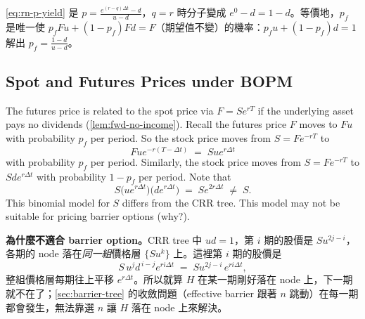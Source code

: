 \suppstart
{}

\begin{remark}
	\eqref{eq:rn-p-yield} 是 $p=\frac{e^{(r-q)\Delta t}-d}{u-d}$，$q=r$ 時分子變成 $e^{0}-d=1-d$。等價地，$p_{f}$ 是唯一使 $p_{f}Fu+(1-p_{f})Fd=F$（期望值不變）的機率：$p_{f}u+(1-p_{f})d=1$ 解出 $p_{f}=\frac{1-d}{u-d}$。
\end{remark}
\suppend

\subsection{Spot and Futures Prices under BOPM}


The futures price is related to the spot price via $F=Se^{rT}$ if the underlying asset pays no dividends (\autoref{lem:fwd-no-income}).
Recall the futures price $F$ moves to $Fu$ with probability $p_{f}$ per period.
So the stock price moves from $S=Fe^{-rT}$ to
\[
	Fue^{-r(T-\Delta t)} \;=\; Sue^{r\Delta t}
\]
with probability $p_{f}$ per period.
Similarly, the stock price moves from $S=Fe^{-rT}$ to $Sde^{r\Delta t}$ with probability $1-p_{f}$ per period.
Note that
\[
	S\bigl(ue^{r\Delta t}\bigr)\bigl(de^{r\Delta t}\bigr) \;=\; Se^{2r\Delta t} \;\neq\; S .
\]
This binomial model for $S$ differs from the CRR tree.
This model may not be suitable for pricing barrier options (why?).

\suppstart
{}

\begin{remark}
	\textbf{為什麼不適合 barrier option。}CRR tree 中 $ud=1$，第 $i$ 期的股價是 $Su^{2j-i}$，各期的 node 落在\emph{同一組}價格層 $\{Su^{k}\}$ 上。這裡第 $i$ 期的股價是
	\[
		S\,u^{j}d^{\,i-j}e^{ri\Delta t} \;=\; Su^{2j-i}\,e^{ri\Delta t} ,
	\]
	整組價格層每期往上平移 $e^{r\Delta t}$。所以就算 $H$ 在某一期剛好落在 node 上，下一期就不在了；\autoref{sec:barrier-tree} 的收斂問題（effective barrier 跟著 $n$ 跳動）在每一期都會發生，無法靠選 $n$ 讓 $H$ 落在 node 上來解決。
\end{remark}
\suppend

